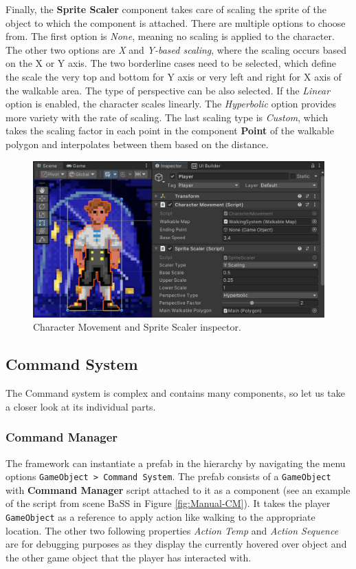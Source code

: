 Finally, the \textbf{Sprite Scaler} component takes care of scaling the sprite of the object to which the component is attached. There are multiple options to choose from. The first option is \textit{None}, meaning no scaling is applied to the character. The other two options are \textit{X }and \textit{Y-based scaling}, where the scaling occurs based on the X or Y axis. The two borderline cases need to be selected, which define the scale the very top and bottom for Y axis or very left and right for X axis of the walkable area. The type of perspective can be also selected. If the \textit{Linear} option is enabled, the character scales linearly. The \textit{Hyperbolic} option provides more variety with the rate of scaling. The last scaling type is \textit{Custom}, which takes the scaling factor in each point in the component \textbf{Point} of the walkable polygon and interpolates between them based on the distance.
\begin{figure}[H]
\centering
\includegraphics[width=0.8\linewidth]{img/User doc/character_movement.png}
\caption{Character Movement and Sprite Scaler inspector.}
\label{fig:Manual-ChM&SS}
\end{figure}

\subsection{Command System}
The Command system is complex and contains many components, so let us take a closer look at its individual parts.

\subsubsection{Command Manager}
The framework can instantiate a prefab in the hierarchy by navigating the menu options \verb|GameObject > Command System|. The prefab consists of a \verb|GameObject| with \textbf{Command Manager} script attached to it as a component (see an example of  the script from scene BaSS in Figure \ref{fig:Manual-CM}). It takes the player \verb|GameObject| as a reference to apply action like walking to the appropriate location. The other two following properties \textit{Action Temp} and \textit{Action Sequence} are for debugging purposes as they display the currently hovered over object and the other game object that the player has interacted with.

